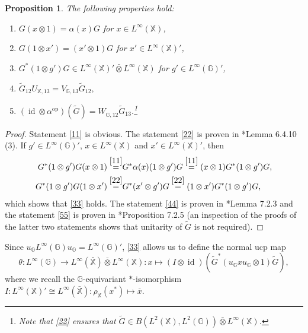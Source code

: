 \documentclass[reqno]{amsart}
\numberwithin{equation}{section}
\newtheorem{Prop}[Theorem]{Proposition}
\DeclareMathOperator{\id}{\mathrm{id}}
\newcommand{\op}{\mathrm{op}}
\newcommand{\G}{\mathbb{G}}
\newcommand{\X}{\mathbb{X}}
\newcommand{\ovot}{\bar{\otimes}}
\begin{document}
\begin{Prop}\label{Galois} The following properties hold:
\begin{enumerate}[label=(\Alph*)]
    \item  $G(x\otimes 1)= \alpha(x) G$ for $x\in L^\infty(\X)$, \label{11}
    \item \label{22} \vspace{-1.5mm}$G(1\otimes x')= (x'\otimes 1)G$ for $x'\in L^\infty(\X)'$,
    \item \label{33} \vspace{-1.5mm}$G^*(1\otimes g')G \in L^\infty(\X)'\ovot L^\infty(\X)$ for $g'\in L^\infty(\G)'$,
\item \label{44} \vspace{-1.5mm}$\tilde{G}_{12}U_{\X,13}= V_{\G, 13}\tilde{G}_{12},$
    \item \label{55} \vspace{-1.5mm}
$(\id \otimes \alpha^{\op})(\tilde{G})= W_{\hat{\G},12}\tilde{G}_{13}$.\footnote{Note that \ref{22} ensures that $\tilde{G}\in B(L^2(\X), L^2(\G))\ovot L^ \infty(\X)$.}
\end{enumerate}
\end{Prop}
\begin{proof} Statement \ref{11} is obvious. The statement \ref{22} is proven in \cite{DC09a}*{Lemma 6.4.10 (3)}. 
If $g'\in L^\infty(\G)'$, $x\in L^\infty(\X)$ and $x'\in L^\infty(\X)'$, then 
\begin{align*}
    G^*(1\otimes g')G(x\otimes 1) \stackrel{\ref{11}}=& G^*\alpha(x) (1\otimes g') G \stackrel{\ref{11}}= (x\otimes 1)G^*(1\otimes g')G,\\
    G^*(1\otimes  g')G(1\otimes x') \stackrel{\ref{22}}=& G^*(x'\otimes g')G \stackrel{\ref{22}}= (1\otimes x')G^*(1\otimes  g')G,
\end{align*}
which shows that \ref{33}  holds. The statement \ref{44} is proven in \cite{DC09a}*{Lemma 7.2.3} and the statement \ref{55} is proven in \cite{DC09a}*{Proposition 7.2.5} (an inspection of the proofs of the latter two statements shows that unitarity of $\tilde{G}$ is not required).
\end{proof}

Since $u_\G L^\infty(\G) u_\G = L^\infty(\G)'$, \ref{33} allows us to define the normal ucp map
\begin{equation}\label{theta}
    \theta: L^\infty(\G)\to L^\infty(\bar{\X})\ovot L^\infty(\X): x \mapsto (I \otimes \id)(\tilde{G}^*(u_\G x u_\G\otimes 1)\tilde{G}),
\end{equation}
where we recall the $\G$-equivariant $*$-isomorphism $I: L^\infty(\X)'\cong L^\infty(\bar{\X}): \rho_\X(x^*)\mapsto \overline{x}$.
\end{document}
